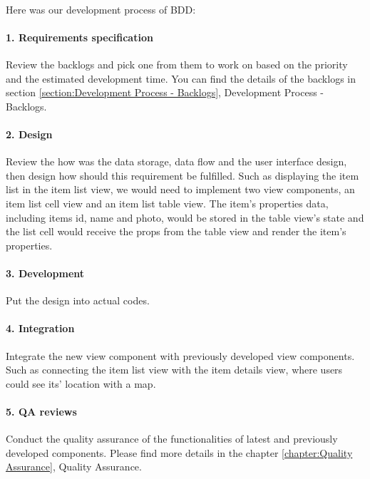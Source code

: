 \documentclass[12pt,a4paper]{article}
\begin{document}
          \paragraph{}Here was our development process of BDD:
          
          \paragraph{1. Requirements specification}Review the backlogs and pick one from them to work on based on the priority and the estimated development time. You can find the details of the backlogs in section \ref{section:Development Process - Backlogs}, Development Process - Backlogs.
          
          \paragraph{2. Design}Review the how was the data storage, data flow and the user interface design, then design how should this requirement be fulfilled. Such as displaying the item list in the item list view, we would need to implement two view components, an item list cell view and an item list table view. The item's properties data, including items id, name and photo, would be stored in the table view's state and the list cell would receive the props from the table view and render the item's properties.
          
          \paragraph{3. Development}Put the design into actual codes.
          
          \paragraph{4. Integration}Integrate the new view component with previously developed view components. Such as connecting the item list view with the item details view, where users could see its' location with a map.
          
          \paragraph{5. QA reviews}Conduct the quality assurance of the functionalities of latest and previously developed components. Please find more details in the chapter \ref{chapter:Quality Assurance}, Quality Assurance.
          
\end{document}
